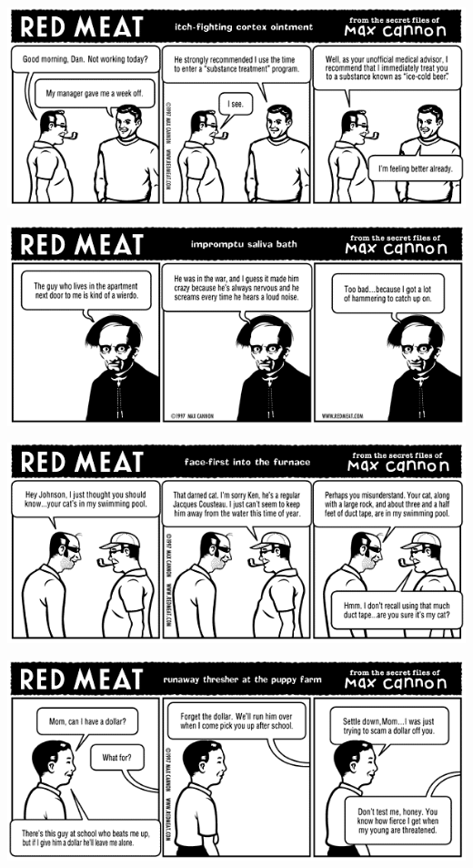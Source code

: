 \documentclass[a4paper,twoside,11pt]{article}
\begin{document}
\includegraphics[width=\textwidth]{redmeat_1997-08-04.png}



\includegraphics[width=\textwidth]{redmeat_1997-08-11.png}



\includegraphics[width=\textwidth]{redmeat_1997-08-18.png}



\includegraphics[width=\textwidth]{redmeat_1997-08-25.png}
\end{document}
